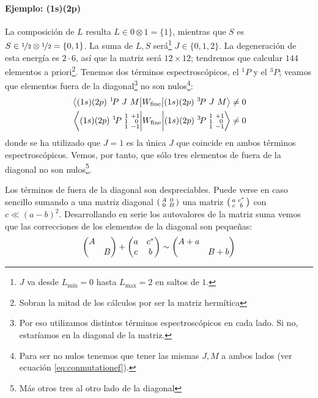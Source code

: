 \paragraph{Ejemplo: (1s)(2p)} La composición de $L$ resulta $L \in 0\otimes1
= \{1\}$, mientras que $S$ es $S\in {\nicefrac{1}{2}} \otimes {\nicefrac{1}{2}} = \{0,1\}$. La suma de
$L,S$ será\footnote{$J$ va desde $L_\text{min}=0$ hasta
  $L_\text{max}=2$ en saltos de $1$.} $J\in\{0,1,2\}$. La
degeneración de esta energía es $2\cdot 6$, así que la matriz será
$12\times12$; tendremos que calcular $144$ elementos a
priori\footnote{Sobran la mitad de los cálculos por ser la matriz hermítica}. Tenemos dos términos espectroscópicos, el ${}^{1}\!P$ y el
${}^{3}\!P$; veamos que elementos fuera de la diagonal\footnote{Por
  eso utilizamos distintos términos espectroscópicos en cada lado. Si
  no, estaríamos en la diagonal de la matriz.} no son
nulos\footnote{Para ser no nulos tenemos que tener las mismas $J,M$ a
  ambos lados (ver ecuación \eqref{eq:conmutationef}).}:
\begin{equation}
  \begin{split}
    \mel{(1s) (2p)\ {}^1\!P\ J\ M}{W_\text{fine}}{(1s) (2p)\ {}^3\!P\
      J\ M} &\neq 0\\
    \mel{
    (1s) (2p)\ {}^1\!P\ 
    \underset{1}{\overset{1}{\scriptstyle 1}} \ 
    \underset{-1}{\overset{+1}{\scriptstyle \  0}}
    }
    {
    W_\text{fine}
    }{
    (1s) (2p)\ {}^3\!P\
    \underset{1}{\overset{1}{\scriptstyle 1}} \ 
    \underset{-1}{\overset{+1}{\scriptstyle \ 0}}
    }
    &\neq 0
  \end{split}
\end{equation}
donde se ha utilizado que $J=1$ es la única $J$ que coincide en
ambos términos espectroscópicos. Vemos, por tanto, que sólo tres
elementos de fuera de la diagonal no son nulos\footnote{Más otros tres
al otro lado de la diagonal}.

Los términos de fuera de la diagonal son despreciables. Puede verse en
caso sencillo sumando a una matriz diagonal $\smqty(A&0\\ 0&B)$ una matriz
$\smqty(a&c^*\\ c &b)$ con $c\ll (a-b)^2$. 
Desarrollando en serie los
autovalores de la matriz suma vemos que las correcciones de los
elementos de la diagonal son pequeñas:
\begin{equation}
  \mqty(A& \\ & B) + \mqty(a&c^* \\ c & b) \sim \mqty(A+a & \\ & B+b)
  \label{eq:twobytwoargument}
\end{equation}

